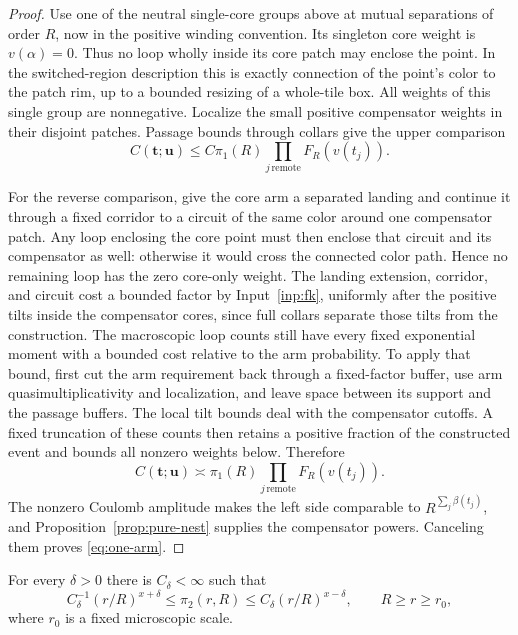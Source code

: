 \begin{proof}
Use one of the neutral single-core groups above at mutual separations
of order $R$, now in the positive winding convention.  Its singleton
core weight is $v(\alpha)=0$.  Thus no loop wholly inside its core
patch may enclose the point.  In the switched-region description this
is exactly connection of the point's color to the patch rim, up to a
bounded resizing of a whole-tile box.  All weights of this single group
are nonnegative.  Localize the small positive compensator weights in
their disjoint patches.  Passage bounds through collars give the upper
comparison
\[
 C(\mathbf t;\mathbf u)
 \le C\pi_1(R)\prod_{j\,\mathrm{remote}}F_R(v(t_j)).
\]

For the reverse comparison, give the core arm a separated landing and
continue it through a fixed corridor to a circuit of the same color
around one compensator patch.  Any loop enclosing the core point must
then enclose that circuit and its compensator as well: otherwise it
would cross the connected color path.  Hence no remaining loop has
the zero core-only weight.  The landing extension, corridor, and
circuit cost a bounded factor by Input~\ref{inp:fk}, uniformly after
the positive tilts inside the compensator cores, since full collars
separate those tilts from the construction.  The macroscopic loop
counts still have every fixed exponential moment with a bounded cost
relative to the arm probability.  To apply that bound, first cut the
arm requirement back through a fixed-factor buffer, use arm
quasimultiplicativity and localization, and leave space between its
support and the passage buffers.  The local tilt bounds deal with the
compensator cutoffs.  A fixed truncation of these counts then retains
a positive fraction of the constructed event and bounds all nonzero
weights below.  Therefore
\[
 C(\mathbf t;\mathbf u)
 \asymp\pi_1(R)\prod_{j\,\mathrm{remote}}F_R(v(t_j)).
\]
The nonzero Coulomb amplitude makes the left side comparable to
$R^{\sum_j\beta(t_j)}$, and
Proposition~\ref{prop:pure-nest} supplies the compensator powers.
Canceling them proves \eqref{eq:one-arm}.
\end{proof}

\begin{lemma}\label{lem:two-arm-log}
For every $\delta>0$ there is $C_\delta<\infty$ such that
\begin{equation}\label{eq:two-arm-log}
 C_\delta^{-1}(r/R)^{x+\delta}
 \le\pi_2(r,R)\le C_\delta(r/R)^{x-\delta},
 \qquad R\ge r\ge r_0,
\end{equation}
where $r_0$ is a fixed microscopic scale.
\end{lemma}

